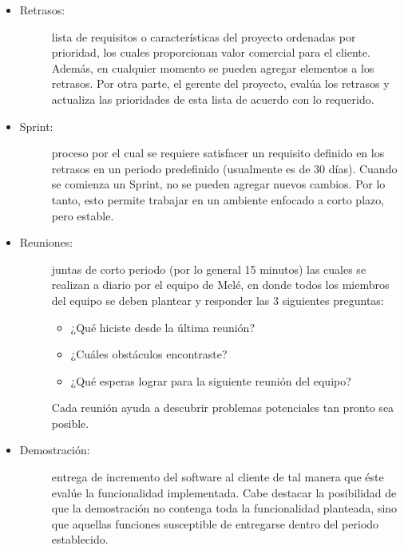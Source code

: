 \begin{itemize}
	\item 	\begin{description}
				\item[Retrasos:] lista de requisitos o características del proyecto ordenadas por prioridad, los cuales proporcionan valor comercial para el cliente. Además, en cualquier momento se pueden agregar elementos a los retrasos. Por otra parte, el gerente del proyecto, evalúa los retrasos y actualiza las prioridades de esta lista de acuerdo con lo requerido. 
			\end{description}

	\item 	\begin{description}
				\item[Sprint:] proceso por el cual se requiere satisfacer un requisito definido en los retrasos en un periodo predefinido (usualmente es de 30 días). Cuando se comienza un Sprint, no se pueden agregar nuevos cambios. Por lo tanto, esto permite trabajar en un ambiente enfocado a corto plazo, pero estable.
			\end{description}

	\item 	\begin{description}
			    \item[Reuniones:] juntas de corto periodo (por lo general 15 minutos) las cuales se realizan a diario por el equipo de Melé, en donde todos los miembros del equipo se deben plantear y responder las 3 siguientes preguntas: 

			    \begin{itemize}
			    	\item ¿Qué hiciste desde la última reunión?

			    	\item ¿Cuáles obstáculos encontraste? 

			    	\item ¿Qué esperas lograr para la siguiente reunión del equipo?
			    \end{itemize}

			 	Cada reunión ayuda a descubrir problemas potenciales tan pronto sea posible.
			\end{description}

	\item 	\begin{description}
				\item[Demostración:] entrega de incremento del software al cliente de tal manera que éste evalúe la funcionalidad implementada. Cabe destacar la posibilidad de que la demostración no contenga toda la funcionalidad planteada, sino que aquellas funciones susceptible de entregarse dentro del periodo establecido.
			\end{description}
\end{itemize}

